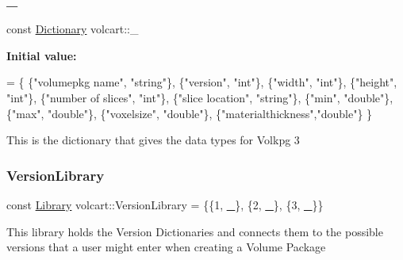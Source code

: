 \subsubsection{\texorpdfstring{\+\_}{\_3}}
{\footnotesize\ttfamily const \hyperlink{namespacevolcart_aa4e334ff80b678b9556aee59618eb37a}{Dictionary} volcart\+::\+\_}

{\bfseries Initial value\+:}
\begin{DoxyCode}
=
        \{
        \{\textcolor{stringliteral}{"volumepkg name"},   \textcolor{stringliteral}{"string"}\},
        \{\textcolor{stringliteral}{"version"},          \textcolor{stringliteral}{"int"}\},
        \{\textcolor{stringliteral}{"width"},            \textcolor{stringliteral}{"int"}\},
        \{\textcolor{stringliteral}{"height"},           \textcolor{stringliteral}{"int"}\},
        \{\textcolor{stringliteral}{"number of slices"}, \textcolor{stringliteral}{"int"}\},
        \{\textcolor{stringliteral}{"slice location"},   \textcolor{stringliteral}{"string"}\},
        \{\textcolor{stringliteral}{"min"},              \textcolor{stringliteral}{"double"}\},
        \{\textcolor{stringliteral}{"max"},              \textcolor{stringliteral}{"double"}\},
        \{\textcolor{stringliteral}{"voxelsize"},        \textcolor{stringliteral}{"double"}\},
        \{\textcolor{stringliteral}{"materialthickness"},\textcolor{stringliteral}{"double"}\}
        \}
\end{DoxyCode}
This is the dictionary that gives the data types for Volkpg 3 \hypertarget{namespacevolcart_a6e45df2f7fa06672b646f6d8dc5ca256}{}\label{namespacevolcart_a6e45df2f7fa06672b646f6d8dc5ca256} 
\subsubsection{\texorpdfstring{Version\+Library}{VersionLibrary}}
{\footnotesize\ttfamily const \hyperlink{namespacevolcart_a90354e3717094cf66f2c1310f12b2e4e}{Library} volcart\+::\+Version\+Library = \{\{1, \hyperlink{namespacevolcart_aff81b62f1e73f2f96669772bab7e2425}{\+\_}\}, \{2, \hyperlink{namespacevolcart_aa72ffe0fec32eedd0bba8af24e731287}{\+\_}\}, \{3, \hyperlink{namespacevolcart_ab457f3dd0e44ebc4ef1ed01c7569938a}{\+\_}\}\}}

This library holds the Version Dictionaries and connects them to the possible versions that a user might enter when creating a Volume Package 